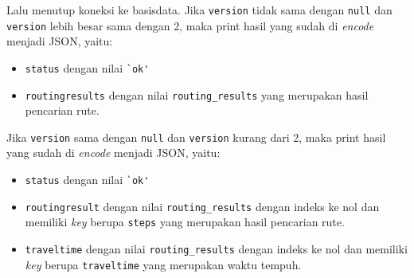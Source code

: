 Lalu menutup koneksi ke basisdata. Jika \verb!version! tidak sama dengan \verb!null! dan \verb!version! lebih besar sama dengan 2, maka print hasil yang sudah di \textit{encode} menjadi JSON, yaitu:
	\begin{itemize}
		\item \verb!status! dengan nilai \verb!`ok'!
		\item \verb!routingresults! dengan nilai \verb!routing_results! yang merupakan hasil pencarian rute.
	\end{itemize}
Jika \verb!version! sama dengan \verb!null! dan \verb!version! kurang dari 2, maka print hasil yang sudah di \textit{encode} menjadi JSON, yaitu:
	\begin{itemize}
		\item \verb!status! dengan nilai \verb!`ok'!
		\item \verb!routingresult! dengan nilai \verb!routing_results! dengan indeks ke nol dan memiliki \textit{key} berupa \verb!steps! yang merupakan hasil pencarian rute.
		\item \verb!traveltime! dengan nilai \verb!routing_results! dengan indeks ke nol dan memiliki \textit{key} berupa \verb!traveltime! yang merupakan waktu tempuh.
	\end{itemize}

